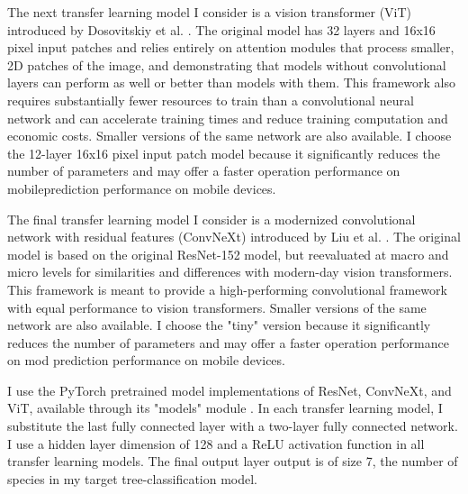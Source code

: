 \documentclass[10pt,twocolumn,letterpaper]{article}
\begin{document}
The next transfer learning model I consider is a vision transformer (ViT) introduced by Dosovitskiy et al. \cite{ViT}. The original model has 32 layers and 16x16 pixel input patches and relies entirely on attention modules that process smaller, 2D patches of the image, and demonstrating that models without convolutional layers can perform as well or better than models with them. This framework also requires substantially fewer resources to train than a convolutional neural network and can accelerate training times and reduce training computation and economic costs. Smaller versions of the same network are also available. I choose the 12-layer 16x16 pixel input patch model because it significantly reduces the number of parameters and may offer a faster operation performance on mobileprediction performance on mobile devices.

The final transfer learning model I consider is a modernized convolutional network with residual features (ConvNeXt) introduced by Liu et al. \cite{ConvNext}. The original model is based on the original ResNet-152 model, but reevaluated at macro and micro levels for similarities and differences with modern-day vision transformers. This framework is meant to provide a high-performing convolutional framework with equal performance to vision transformers. Smaller versions of the same network are also available. I choose the "tiny" version because it significantly reduces the number of parameters and may offer a faster operation performance on mod prediction performance on mobile devices.

I use the PyTorch pretrained model implementations of ResNet, ConvNeXt, and ViT, available through its "models" module \cite{PyTorch}. In each transfer learning model, I substitute the last fully connected layer with a two-layer fully connected network. I use a hidden layer dimension of 128 and a ReLU activation function in all transfer learning models. The final output layer output is of size 7, the number of species in my target tree-classification model. 
\end{document}
